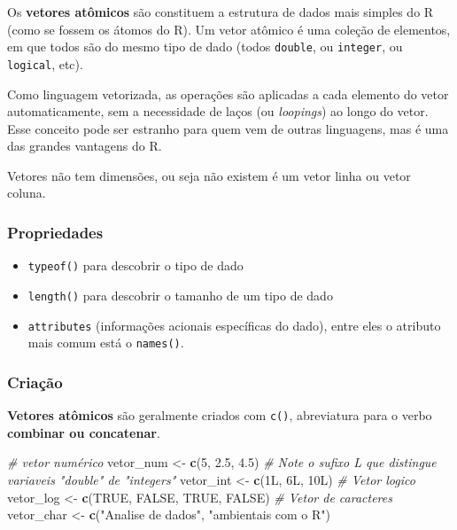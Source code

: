 \documentclass[]{book}
\newenvironment{Shaded}{\begin{snugshade}}{\end{snugshade}}
\newcommand{\KeywordTok}[1]{\textcolor[rgb]{0.13,0.29,0.53}{\textbf{#1}}}
\newcommand{\DecValTok}[1]{\textcolor[rgb]{0.00,0.00,0.81}{#1}}
\newcommand{\FloatTok}[1]{\textcolor[rgb]{0.00,0.00,0.81}{#1}}
\newcommand{\StringTok}[1]{\textcolor[rgb]{0.31,0.60,0.02}{#1}}
\newcommand{\CommentTok}[1]{\textcolor[rgb]{0.56,0.35,0.01}{\textit{#1}}}
\newcommand{\OtherTok}[1]{\textcolor[rgb]{0.56,0.35,0.01}{#1}}
\newcommand{\NormalTok}[1]{#1}
\begin{document}
Os \textbf{vetores atômicos} são constituem a estrutura de dados mais
simples do R (como se fossem os átomos do R). Um vetor atômico é uma
coleção de elementos, em que todos são do mesmo tipo de dado (todos
\texttt{double}, ou \texttt{integer}, ou \texttt{logical}, etc).

Como linguagem vetorizada, as operações são aplicadas a cada elemento do
vetor automaticamente, sem a necessidade de laços (ou \emph{loopings})
ao longo do vetor. Esse conceito pode ser estranho para quem vem de
outras linguagens, mas é uma das grandes vantagens do R.

Vetores não tem dimensões, ou seja não existem é um vetor linha ou vetor
coluna.

\subsubsection{Propriedades}\label{propriedades}

\begin{itemize}
\item
  \texttt{typeof()} para descobrir o tipo de dado
\item
  \texttt{length()} para descobrir o tamanho de um tipo de dado
\item
  \texttt{attributes} (informações acionais específicas do dado), entre
  eles o atributo mais comum está o \texttt{names()}.
\end{itemize}

\subsubsection{Criação}\label{criacao}

\textbf{Vetores atômicos} são geralmente criados com \texttt{c()},
abreviatura para o verbo \textbf{combinar ou concatenar}.

\begin{Shaded}
\begin{Highlighting}[]
\CommentTok{# vetor numérico}
\NormalTok{vetor_num <-}\StringTok{ }\KeywordTok{c}\NormalTok{(}\DecValTok{5}\NormalTok{, }\FloatTok{2.5}\NormalTok{, }\FloatTok{4.5}\NormalTok{)}
\CommentTok{# Note o sufixo L que distingue variaveis "double" de "integers"}
\NormalTok{vetor_int <-}\StringTok{ }\KeywordTok{c}\NormalTok{(1L, 6L, 10L)}
\CommentTok{# Vetor logico}
\NormalTok{vetor_log <-}\StringTok{ }\KeywordTok{c}\NormalTok{(}\OtherTok{TRUE}\NormalTok{, }\OtherTok{FALSE}\NormalTok{, }\OtherTok{TRUE}\NormalTok{, }\OtherTok{FALSE}\NormalTok{)}
\CommentTok{# Vetor de caracteres}
\NormalTok{vetor_char <-}\StringTok{ }\KeywordTok{c}\NormalTok{(}\StringTok{"Analise de dados"}\NormalTok{, }\StringTok{"ambientais com o R"}\NormalTok{)}
\end{Highlighting}
\end{Shaded}
\end{document}
